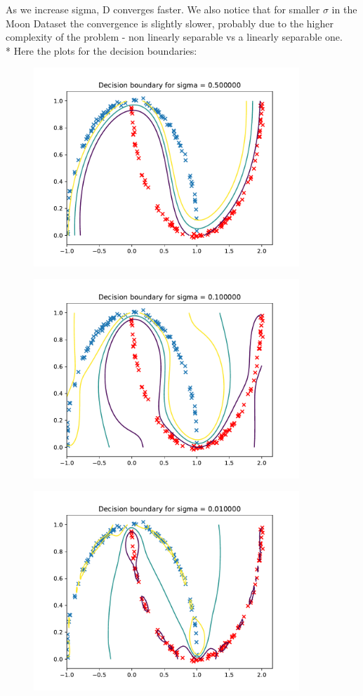 \documentclass[english]{exercisesheet}
\begin{document}
\begin{solution}
        As we increase sigma, D converges faster. We also notice that for smaller $\sigma$ in the Moon Dataset the convergence is slightly slower, probably due to the higher complexity of the problem - non linearly separable vs a linearly separable one.
        \\*
        Here the plots for the decision boundaries: 
 \begin{figure}[H]
        \centering
        \includegraphics[width=10cm]{decision_boundary_2.pdf}
        \end{figure}
 \begin{figure}[H]
        \centering
        \includegraphics[width=10cm]{decision_boundary_0.pdf}
        \end{figure}
 \begin{figure}[H]
        \centering
        \includegraphics[width=10cm]{decision_boundary_1.pdf}
        \end{figure}
 \end{solution}
\end{document}
